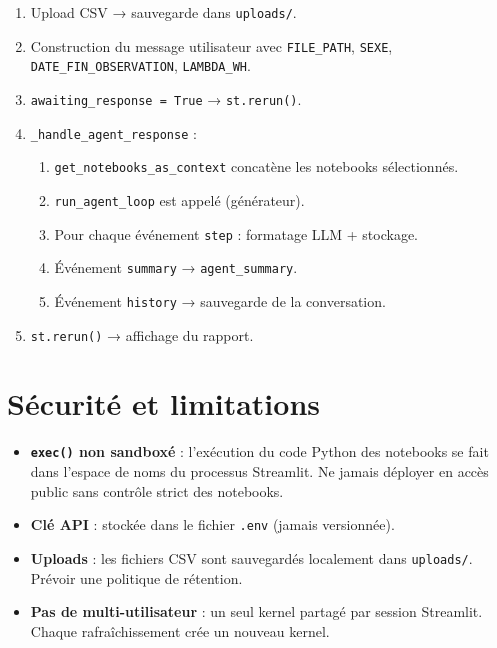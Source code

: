 \documentclass[11pt,a4paper]{article}
\begin{document}
\begin{enumerate}
  \item Upload CSV → sauvegarde dans \texttt{uploads/}.
  \item Construction du message utilisateur avec \texttt{FILE\_PATH}, \texttt{SEXE},
        \texttt{DATE\_FIN\_OBSERVATION}, \texttt{LAMBDA\_WH}.
  \item \texttt{awaiting\_response = True} → \texttt{st.rerun()}.
  \item \texttt{\_handle\_agent\_response} :
    \begin{enumerate}[label=\alph*.]
      \item \texttt{get\_notebooks\_as\_context} concatène les notebooks sélectionnés.
      \item \texttt{run\_agent\_loop} est appelé (générateur).
      \item Pour chaque événement \texttt{step} : formatage LLM + stockage.
      \item Événement \texttt{summary} → \texttt{agent\_summary}.
      \item Événement \texttt{history} → sauvegarde de la conversation.
    \end{enumerate}
  \item \texttt{st.rerun()} → affichage du rapport.
\end{enumerate}

\section{Sécurité et limitations}

\begin{itemize}
  \item \textbf{\texttt{exec()} non sandboxé} : l'exécution du code Python des notebooks
        se fait dans l'espace de noms du processus Streamlit. Ne jamais déployer
        en accès public sans contrôle strict des notebooks.
  \item \textbf{Clé API} : stockée dans le fichier \texttt{.env} (jamais versionnée).
  \item \textbf{Uploads} : les fichiers CSV sont sauvegardés localement dans \texttt{uploads/}.
        Prévoir une politique de rétention.
  \item \textbf{Pas de multi-utilisateur} : un seul kernel partagé par session Streamlit.
        Chaque rafraîchissement crée un nouveau kernel.
\end{itemize}
\end{document}

